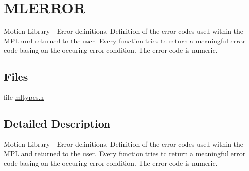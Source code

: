 \hypertarget{group___m_l_e_r_r_o_r}{}\section{M\+L\+E\+R\+R\+O\+R}
\label{group___m_l_e_r_r_o_r}


Motion Library -\/ Error definitions. Definition of the error codes used within the M\+P\+L and returned to the user. Every function tries to return a meaningful error code basing on the occuring error condition. The error code is numeric.  


\subsection*{Files}
\begin{DoxyCompactItemize}
\item 
file \hyperlink{mltypes_8h}{mltypes.\+h}
\end{DoxyCompactItemize}


\subsection{Detailed Description}
Motion Library -\/ Error definitions. Definition of the error codes used within the M\+P\+L and returned to the user. Every function tries to return a meaningful error code basing on the occuring error condition. The error code is numeric. 

